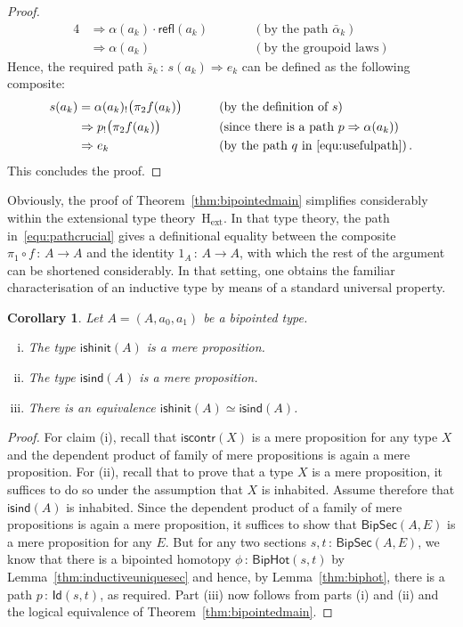 \documentclass[10pt,a4paper,oneside,reqno]{amsart}
\theoremstyle{mythm}
\newtheorem{corollary}[theorem]{Corollary}
\theoremstyle{mydef}
\theoremstyle{myrmk}
\newcommand{\deq}{=}
\newcommand{\co}{\,{:}\,}
\newcommand{\ct}{\cdot}
\newcommand{\Hext}{\mathrm{H}_{\mathrm{ext}}}
\newcommand{\iscontr}{\mathsf{iscontr}}
\newcommand{\isbipind}{\mathsf{isind}}
\newcommand{\isbiphinit}{\mathsf{ishinit}}
\newcommand{\Id}{\mathsf{Id}}
\newcommand{\refl}{\mathsf{refl}}
\newcommand{\BipHot}{\mathsf{BipHot}}
\newcommand{\BipSec}{\mathsf{BipSec}}
\begin{document}
\begin{proof}
\begin{alignat*}{4}
  & \Rightarrow  \alpha(a_k) \ct \refl(a_k) & &  \qquad (\text{by the path } \bar{\alpha}_k ) \\ 
  & \Rightarrow  \alpha(a_k)  & & \qquad (\text{by the groupoid laws})
\end{alignat*} 
Hence,  the required path $\bar{s}_k \co  s(a_k) \Rightarrow e_k$ can be defined as the following composite:
\begin{alignat*}{4}
s(a_k) & \deq \alpha(a_k)_{!} \big( \pi_2 f(a_k)  \big) & & \qquad (\text{by the definition of } s) \\
 &              \Rightarrow   p_{!} \big( \pi_2 f(a_k)  \big) & & \qquad (\text{since there is a path } p \Rightarrow \alpha(a_k)) \\
   &            \Rightarrow  e_k  & &  \qquad (\text{by the path } q \text{ in } \eqref{equ:usefulpath})  \, .
   \end{alignat*} 
   This concludes the proof.
\end{proof}


Obviously, the proof of Theorem~\ref{thm:bipointedmain} simplifies considerably within the extensional
type theory~$\Hext$. In that type theory, the path in~\eqref{equ:pathcrucial} gives a definitional equality 
between the composite $\pi_1 \circ f \co A \to A$ and the identity $1_A \co A \to A$, with which the
rest of the argument can be shortened considerably. In that setting, one obtains the familiar characterisation 
of an inductive type by means of a standard universal property.



\begin{corollary}  Let $A = (A, a_0, a_1)$ be a bipointed type.
\begin{enumerate}[(i)]
\item The type $\isbiphinit(A)$ is a mere proposition.
\item The type $\isbipind(A)$ is a mere proposition.
\item There is an equivalence $\isbiphinit(A) \simeq \isbipind(A)$. 
\end{enumerate} 
\end{corollary}

\begin{proof} For claim (i), recall that  $\iscontr(X)$ is a mere proposition for any type $X$ and the dependent product of family of mere propositions is again a mere proposition. For (ii), recall that to prove that a type $X$ is a mere proposition, it suffices to do so under the assumption that $X$ is inhabited. Assume therefore that $\isbipind(A)$ is inhabited. Since the dependent product of a family of mere propositions is again a mere proposition, it suffices to show that $\BipSec(A,E)$ is a mere proposition for any $E$. But for any two sections $s, t \co \BipSec(A,E)$, we know that there is a 
bipointed homotopy $\phi \co \BipHot(s,t)$ by Lemma~\ref{thm:inductiveuniquesec} and hence, by 
Lemma~\ref{thm:biphot}, there is a path $p \co \Id(s,t)$, as required. Part (iii) now follows from parts (i) and (ii) and  the logical equivalence of  Theorem~\ref{thm:bipointedmain}. 
\end{proof}
\end{document}
